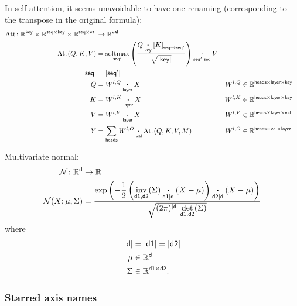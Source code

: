 In self-attention, it seems unavoidable to have one renaming (corresponding to the transpose in the original formula):
\begin{align*}
  \text{Att} \colon \mathbb{R}^{\name{key}} \times \mathbb{R}^{\name{seq} \times\name{key}} \times \mathbb{R}^{\name{seq} \times\name{val}} &\rightarrow \mathbb{R}^{\name{val}} \\
  \text{Att}(Q,K,V) &= \nfun{seq'}{softmax} \left( \frac{Q \ndot{key} \nmov{seq}{seq'}{K}}{\sqrt{|\name{key}|}} \right) \nndot{seq'}{seq} V \\
  |\name{seq}| &= |\name{seq'}| \\
  Q &= W^{l,Q} \ndot{layer} X & W^{l,Q} &\in \mathbb{R}^{\name{heads} \times \name{layer} \times \name{key}} \\
  K &= W^{l,K} \ndot{layer} X & W^{l,K} &\in \mathbb{R}^{\name{heads} \times \name{layer} \times \name{key}} \\
  V &= W^{l,V} \ndot{layer} X & W^{l,V} &\in \mathbb{R}^{\name{heads} \times \name{layer} \times \name{val}} \\
  Y &= \nsum{heads} W^{l,O} \ndot{val} \text{Att}(Q, K, V, M) & W^{l,O} &\in \mathbb{R}^{\name{heads} \times \name{val} \times \name{layer}}
\end{align*}

Multivariate normal:
\begin{align*}
\mathcal{N} \colon \reals^{\name{d}} &\rightarrow \reals \\
\mathcal{N}(X; \mu, \Sigma) &= \frac{\displaystyle \exp\left(-\frac{1}{2}  \left(\nfun{d1, d2}{inv}(\Sigma) \nndot{d1}{d} (X - \mu) \right) \nndot{d2}{d} (X - \mu) \right)}{\sqrt{(2 \pi)^{|\name{d}|} \nfun{d1, d2}{det}(\Sigma)}}
\end{align*}
where
\begin{align*}
|\name{d}| &= |\name{d1}| = |\name{d2}| \\
\mu &\in \reals^{\name{d}} \\
\Sigma & \in \reals^{\name{d1} \times \name{d2}}.
\end{align*}

\subsubsection{Starred axis names}

